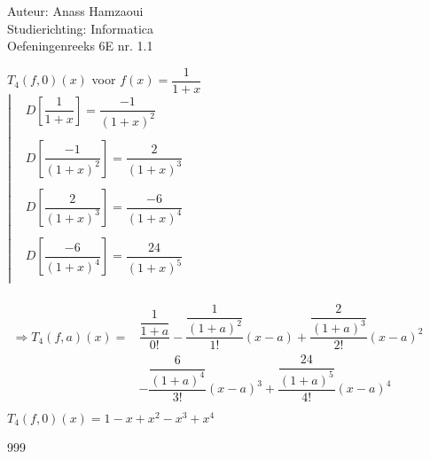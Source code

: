 \documentclass[a4paper]{article}
\begin{document}
  
\noindent \large Auteur: Anass Hamzaoui \\
\noindent \large Studierichting: Informatica \\
\noindent \large Oefeningenreeks 6E nr. 1.1 \\

\medskip

\normalsize

$T_4(f, 0)(x)$ voor $f(x) = \dfrac{1}{1+x}$ \\

$\left|\begin{array}{ll}
     &  D\left[ \dfrac{1}{1+x} \right] = \dfrac{-1}{(1+x)^2} \\
     \\
     &  D\left[ \dfrac{-1}{(1+x)^2} \right] = \dfrac{2}{(1+x)^3} \\
     \\
     &  D\left[ \dfrac{2}{(1+x)^3} \right] = \dfrac{-6}{(1+x)^4} \\
     \\
     &  D\left[ \dfrac{-6}{(1+x)^4} \right] = \dfrac{24}{(1+x)^5} \\
\end{array}\right.$ \\
\\

$\begin{array}{ll}
    \Rightarrow T_4(f, a)(x) = & \dfrac{\dfrac{1}{1+a}}{0!} - \dfrac{\dfrac{1}{(1+a)^2}}{1!}(x-a) + \dfrac{\dfrac{2}{(1+a)^3}}{2!}(x-a)^2 \\
    & - \dfrac{\dfrac{6}{(1+a)^4}}{3!}(x-a)^3 + \dfrac{\dfrac{24}{(1+a)^5}}{4!}(x-a)^4 \\
\end{array}$ \\

$T_4(f, 0)(x) = 1 - x + x^2 - x^3 + x^4$ \\

\begin{thebibliography}{999}
\end{thebibliography}
\end{document}
